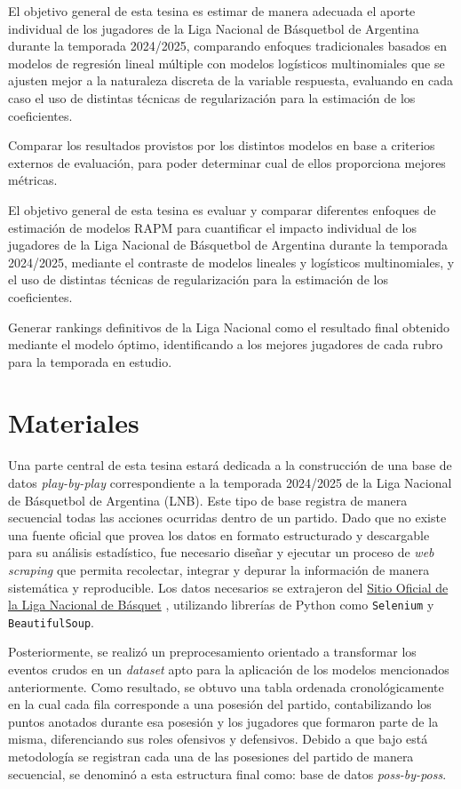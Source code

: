 \documentclass[
]{article}
\begin{document}
El objetivo general de esta tesina es estimar de manera adecuada el
aporte individual de los jugadores de la Liga Nacional de Básquetbol de
Argentina durante la temporada 2024/2025, comparando enfoques
tradicionales basados en modelos de regresión lineal múltiple con
modelos logísticos multinomiales que se ajusten mejor a la naturaleza
discreta de la variable respuesta, evaluando en cada caso el uso de
distintas técnicas de regularización para la estimación de los
coeficientes.

Comparar los resultados provistos por los distintos modelos en base a
criterios externos de evaluación, para poder determinar cual de ellos
proporciona mejores métricas.

El objetivo general de esta tesina es evaluar y comparar diferentes
enfoques de estimación de modelos RAPM para cuantificar el impacto
individual de los jugadores de la Liga Nacional de Básquetbol de
Argentina durante la temporada 2024/2025, mediante el contraste de
modelos lineales y logísticos multinomiales, y el uso de distintas
técnicas de regularización para la estimación de los coeficientes.

Generar rankings definitivos de la Liga Nacional como el resultado final
obtenido mediante el modelo óptimo, identificando a los mejores
jugadores de cada rubro para la temporada en estudio.

\section{Materiales}\label{materiales}

Una parte central de esta tesina estará dedicada a la construcción de
una base de datos \emph{play-by-play} correspondiente a la temporada
2024/2025 de la Liga Nacional de Básquetbol de Argentina (LNB). Este
tipo de base registra de manera secuencial todas las acciones ocurridas
dentro de un partido. Dado que no existe una fuente oficial que provea
los datos en formato estructurado y descargable para su análisis
estadístico, fue necesario diseñar y ejecutar un proceso de \emph{web
scraping} que permita recolectar, integrar y depurar la información de
manera sistemática y reproducible. Los datos necesarios se extrajeron
del \href{https://www.laliganacional.com.ar/laliga/}{Sitio Oficial de la
Liga Nacional de Básquet} , utilizando librerías de Python como
\texttt{Selenium} y \texttt{BeautifulSoup}.

Posteriormente, se realizó un preprocesamiento orientado a transformar
los eventos crudos en un \emph{dataset} apto para la aplicación de los
modelos mencionados anteriormente. Como resultado, se obtuvo una tabla
ordenada cronológicamente en la cual cada fila corresponde a una
posesión del partido, contabilizando los puntos anotados durante esa
posesión y los jugadores que formaron parte de la misma, diferenciando
sus roles ofensivos y defensivos. Debido a que bajo está metodología se
registran cada una de las posesiones del partido de manera secuencial,
se denominó a esta estructura final como: base de datos
\emph{poss-by-poss}.
\end{document}
